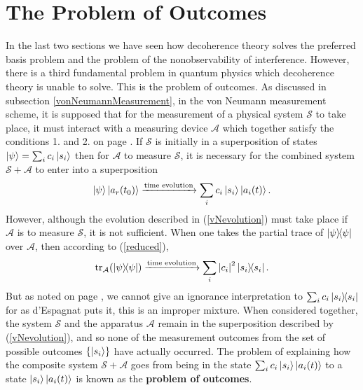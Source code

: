    \section{The Problem of Outcomes}\label{probOutcomes}
    In the last two sections we have seen how decoherence theory solves the preferred basis problem and the problem of the nonobservability of interference. However, there is a third fundamental problem in quantum physics which decoherence theory is unable to solve. This is the problem of outcomes. As discussed in subsection \ref{vonNeumannMeasurement}, in the von Neumann measurement scheme, it is supposed that for the measurement of a physical system $\mathcal{S}$ to take place, it must interact with a measuring device $\mathcal{A}$ which together satisfy the conditions 1. and 2. on page \pageref{vonNeumannMeasurement1}. If $\mathcal{S}$ is initially in a superposition of states $\ket{\psi}=\sum_i c_i\ket{s_i}$ then for $\mathcal{A}$ to measure $\mathcal{S}$, it is necessary for the combined system $\mathcal{S}+\mathcal{A}$ to enter into a superposition
    \begin{equation}\label{vNevolution}
    \ket{\psi}\ket{a_r(t_0)}\xrightarrow{\text{time evolution}}\sum_i c_i\ket{s_i}\ket{a_i(t)}.
    \end{equation}
    However, although the evolution described in (\ref{vNevolution}) must take place if $\mathcal{A}$ is to measure $\mathcal{S}$, it is not sufficient. When one takes the partial trace of $\dyad{\psi}$ over $\mathcal{A}$, then according to (\ref{reduced}),
    \begin{equation}\label{vNevolution2}
    \tr_\mathcal{A}(\dyad{\psi})\xrightarrow{\text{time evolution}}\sum_i \abs{c_i}^2\dyad{s_i}.
    \end{equation}
    But as noted on page \pageref{Espagnat}, we cannot give an ignorance interpretation to $\sum_i c_i\dyad{s_i}$ for as d'Espagnat puts it, this is an improper mixture. When considered together, the system $\mathcal{S}$ and the apparatus $\mathcal{A}$ remain in the superposition described by (\ref{vNevolution}), and so none of the measurement outcomes from the set of possible outcomes $\{\ket{s_i}\}$ have actually occurred. The problem of explaining how the composite system   $\mathcal{S}+\mathcal{A}$       goes from being in the state $\sum_i c_i\ket{s_i}\ket{a_i(t)}$ to a state $\ket{s_i}\ket{a_i(t)}$ is known as the \textbf{problem of outcomes}. 
    
   